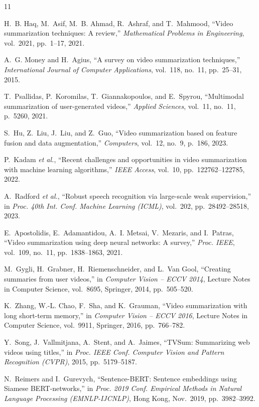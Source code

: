 \documentclass[12pt, a4paper]{report}
\begin{document}


\begin{thebibliography}{11}

H.~B. Haq, M.~Asif, M.~B. Ahmad, R.~Ashraf, and T.~Mahmood,
``Video summarization techniques: A review,''
\textit{Mathematical Problems in Engineering}, vol.~2021, pp.~1--17, 2021.

A.~G. Money and H.~Agius,
``A survey on video summarization techniques,''
\textit{International Journal of Computer Applications}, vol.~118, no.~11,
pp.~25--31, 2015.

T.~Psallidas, P.~Koromilas, T.~Giannakopoulos, and E.~Spyrou,
``Multimodal summarization of user-generated videos,''
\textit{Applied Sciences}, vol.~11, no.~11, p.~5260, 2021.

S.~Hu, Z.~Liu, J.~Liu, and Z.~Guo,
``Video summarization based on feature fusion and data augmentation,''
\textit{Computers}, vol.~12, no.~9, p.~186, 2023.

P.~Kadam \textit{et al.},
``Recent challenges and opportunities in video summarization with machine learning
algorithms,''
\textit{IEEE Access}, vol.~10, pp.~122762--122785, 2022.

A.~Radford \textit{et al.},
``Robust speech recognition via large-scale weak supervision,''
in \textit{Proc. 40th Int. Conf. Machine Learning (ICML)}, vol.~202,
pp.~28492--28518, 2023.

E.~Apostolidis, E.~Adamantidou, A.~I. Metsai, V.~Mezaris, and I.~Patras,
``Video summarization using deep neural networks: A survey,''
\textit{Proc. IEEE}, vol.~109, no.~11, pp.~1838--1863, 2021.

M.~Gygli, H.~Grabner, H.~Riemenschneider, and L.~Van Gool,
``Creating summaries from user videos,''
in \textit{Computer Vision -- ECCV 2014}, Lecture Notes in Computer Science,
vol.~8695, Springer, 2014, pp.~505--520.

K.~Zhang, W.-L. Chao, F.~Sha, and K.~Grauman,
``Video summarization with long short-term memory,''
in \textit{Computer Vision -- ECCV 2016}, Lecture Notes in Computer Science,
vol.~9911, Springer, 2016, pp.~766--782.

Y.~Song, J.~Vallmitjana, A.~Stent, and A.~Jaimes,
``TVSum: Summarizing web videos using titles,''
in \textit{Proc. IEEE Conf. Computer Vision and Pattern Recognition (CVPR)},
2015, pp.~5179--5187.

N.~Reimers and I.~Gurevych,
``Sentence-BERT: Sentence embeddings using Siamese BERT-networks,''
in \textit{Proc. 2019 Conf. Empirical Methods in Natural Language Processing
(EMNLP-IJCNLP)}, Hong Kong, Nov.~2019, pp.~3982--3992.

\end{thebibliography}
\end{document}
